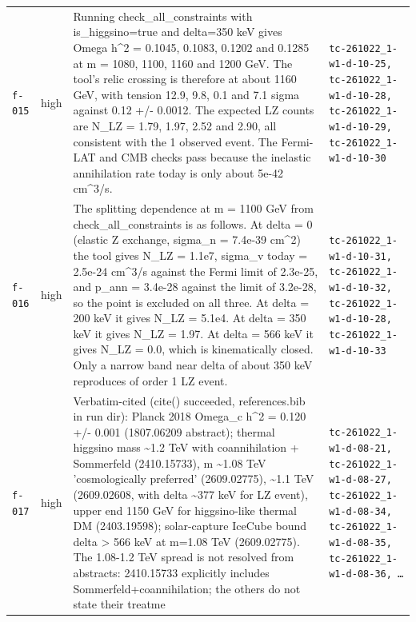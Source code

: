 \documentclass[11pt,a4paper]{article}
\begin{document}
\begin{longtable}{@{}p{}p{}p{}p{}@{}}
\texttt{f-015} & high & Running check\_all\_constraints with is\_higgsino=true and delta=350 keV gives Omega h\textasciicircum{}2 = 0.1045, 0.1083, 0.1202 and 0.1285 at m = 1080, 1100, 1160 and 1200 GeV. The tool's relic crossing is therefore at about 1160 GeV, with tension 12.9, 9.8, 0.1 and 7.1 sigma against 0.12 +/- 0.0012. The expected LZ counts are N\_LZ = 1.79, 1.97, 2.52 and 2.90, all consistent with the 1 observed event. The Fermi-LAT and CMB checks pass because the inelastic annihilation rate today is only about 5e-42 cm\textasciicircum{}3/s. & \texttt{tc-261022\_\allowbreak{}1-w1-d-10-25,\allowbreak{} tc-261022\_\allowbreak{}1-w1-d-10-28,\allowbreak{} tc-261022\_\allowbreak{}1-w1-d-10-29,\allowbreak{} tc-261022\_\allowbreak{}1-w1-d-10-30} \\
\texttt{f-016} & high & The splitting dependence at m = 1100 GeV from check\_all\_constraints is as follows. At delta = 0 (elastic Z exchange, sigma\_n = 7.4e-39 cm\textasciicircum{}2) the tool gives N\_LZ = 1.1e7, sigma\_v today = 2.5e-24 cm\textasciicircum{}3/s against the Fermi limit of 2.3e-25, and p\_ann = 3.4e-28 against the limit of 3.2e-28, so the point is excluded on all three. At delta = 200 keV it gives N\_LZ = 5.1e4. At delta = 350 keV it gives N\_LZ = 1.97. At delta = 566 keV it gives N\_LZ = 0.0, which is kinematically closed. Only a narrow band near delta of about 350 keV reproduces of order 1 LZ event. & \texttt{tc-261022\_\allowbreak{}1-w1-d-10-31,\allowbreak{} tc-261022\_\allowbreak{}1-w1-d-10-32,\allowbreak{} tc-261022\_\allowbreak{}1-w1-d-10-28,\allowbreak{} tc-261022\_\allowbreak{}1-w1-d-10-33} \\
\texttt{f-017} & high & Verbatim-cited (cite() succeeded, references.bib in run dir): Planck 2018 Omega\_c h\textasciicircum{}2 = 0.120 +/- 0.001 (1807.06209 abstract); thermal higgsino mass \textasciitilde{}1.2 TeV with coannihilation + Sommerfeld (2410.15733), m \textasciitilde{}1.08 TeV 'cosmologically preferred' (2609.02775), \textasciitilde{}1.1 TeV (2609.02608, with delta \textasciitilde{}377 keV for LZ event), upper end 1150 GeV for higgsino-like thermal DM (2403.19598); solar-capture IceCube bound delta \textgreater{} 566 keV at m=1.08 TeV (2609.02775). The 1.08-1.2 TeV spread is not resolved from abstracts: 2410.15733 explicitly includes Sommerfeld+coannihilation; the others do not state their treatme & \texttt{tc-261022\_\allowbreak{}1-w1-d-08-21,\allowbreak{} tc-261022\_\allowbreak{}1-w1-d-08-27,\allowbreak{} tc-261022\_\allowbreak{}1-w1-d-08-34,\allowbreak{} tc-261022\_\allowbreak{}1-w1-d-08-35,\allowbreak{} tc-261022\_\allowbreak{}1-w1-d-08-36,\allowbreak{} \ldots{}\allowbreak{}} \\

\end{longtable}
\end{document}
